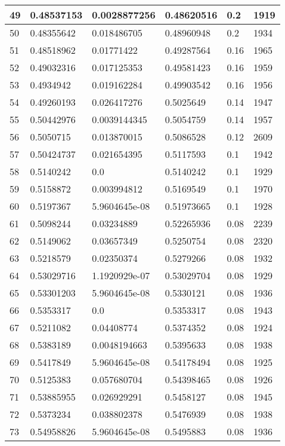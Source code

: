 \begin{longtable}{|l|l|l|l|l|l|}
49 & 0.48537153 & 0.0028877256 & 0.48620516 & 0.2 & 1919 \\ \hline 
50 & 0.48355642 & 0.018486705 & 0.48960948 & 0.2 & 1934 \\ \hline 
51 & 0.48518962 & 0.01771422 & 0.49287564 & 0.16 & 1965 \\ \hline 
52 & 0.49032316 & 0.017125353 & 0.49581423 & 0.16 & 1959 \\ \hline 
53 & 0.4934942 & 0.019162284 & 0.49903542 & 0.16 & 1956 \\ \hline 
54 & 0.49260193 & 0.026417276 & 0.5025649 & 0.14 & 1947 \\ \hline 
55 & 0.50442976 & 0.0039144345 & 0.5054759 & 0.14 & 1957 \\ \hline 
56 & 0.5050715 & 0.013870015 & 0.5086528 & 0.12 & 2609 \\ \hline 
57 & 0.50424737 & 0.021654395 & 0.5117593 & 0.1 & 1942 \\ \hline 
58 & 0.5140242 & 0.0 & 0.5140242 & 0.1 & 1929 \\ \hline 
59 & 0.5158872 & 0.003994812 & 0.5169549 & 0.1 & 1970 \\ \hline 
60 & 0.5197367 & 5.9604645e-08 & 0.51973665 & 0.1 & 1928 \\ \hline 
61 & 0.5098244 & 0.03234889 & 0.52265936 & 0.08 & 2239 \\ \hline 
62 & 0.5149062 & 0.03657349 & 0.5250754 & 0.08 & 2320 \\ \hline 
63 & 0.5218579 & 0.02350374 & 0.5279266 & 0.08 & 1932 \\ \hline 
64 & 0.53029716 & 1.1920929e-07 & 0.53029704 & 0.08 & 1929 \\ \hline 
65 & 0.53301203 & 5.9604645e-08 & 0.5330121 & 0.08 & 1936 \\ \hline 
66 & 0.5353317 & 0.0 & 0.5353317 & 0.08 & 1943 \\ \hline 
67 & 0.5211082 & 0.04408774 & 0.5374352 & 0.08 & 1924 \\ \hline 
68 & 0.5383189 & 0.0048194663 & 0.5395633 & 0.08 & 1938 \\ \hline 
69 & 0.5417849 & 5.9604645e-08 & 0.54178494 & 0.08 & 1925 \\ \hline 
70 & 0.5125383 & 0.057680704 & 0.54398465 & 0.08 & 1926 \\ \hline 
71 & 0.53885955 & 0.026929291 & 0.5458127 & 0.08 & 1945 \\ \hline 
72 & 0.5373234 & 0.038802378 & 0.5476939 & 0.08 & 1938 \\ \hline 
73 & 0.54958826 & 5.9604645e-08 & 0.5495883 & 0.08 & 1936 \\ \hline 

\end{longtable}
